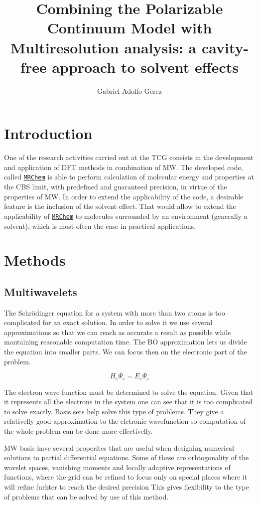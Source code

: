\documentclass[a4paper,11pt]{article}
\title{Combining the Polarizable Continuum Model with Multiresolution
  analysis: a cavity-free approach to solvent effects}
\author{Gabriel Adolfo Gerez}
\newcommand{\mrchem}{\href{https://mrchem.readthedocs.io/en/latest/}{\texttt{MRChem}}}
\begin{document}
\maketitle

\section{Introduction}

One of the research activities carried out at the \ac{TCG} consists in
the development and application of \ac{DFT} methods in combination of
\ac{MW}. The developed code, called \mrchem{} is able to perform calculation of
molecular energy and properties at the \ac{CBS} limit, with
predefined and guaranteed precision, in virtue of the properties of
\ac{MW}. In order to extend the applicability of the code, a desirable
feature is the inclusion of the solvent effect. That would allow to
extend the applicability of \mrchem{} to molecules surrounded by an
environment (generally a solvent), which is most often the case in
practical applications.

\section{Methods}

\subsection{Multiwavelets}
The Schrödinger equation for a system with more than two atoms is too
complicated for an exact solution. In order to solve it we use several
approximations so that we can reach as accurate a result as possible
while mantaining reasonable computation time.  The \ac{BO}
approximation lets us divide the equation into smaller parts. We can
focus then on the electronic part of the problem.

\begin{equation}
H_e \Psi_e = E_e \Psi_e
\end{equation}

The electron wave-function must be determined to solve the
equation. Given that it represents all the electrons in the system
one can see that it is too complicated to solve exactly. Basis sets
help solve this type of problems. They give a relativelly good
approximation to the elctronic wavefunction so computation of the
whole problem can be done more effectivelly.


\ac{MW} basis have several properites that are useful when designing
numerical solutions to partial differential equations. Some of these
are orhtogonality of the wavelet spaces, vanishing moments
and locally adaptive representations of functions, where the grid can
be refined to focus only on special places where it will refine
furhter to reach the desired precision \cite{Frediani:2013}
This gives flexibility to the type of problems that can be solved by use of
this method.
\end{document}
